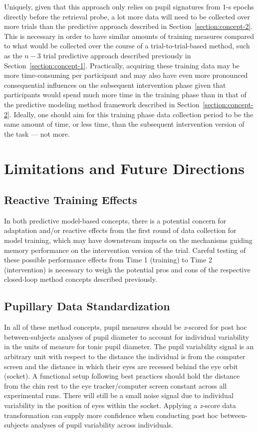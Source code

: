 Uniquely, given that this approach only relies on pupil signatures from 1-s epochs directly before the retrieval probe, a lot more data will need to be collected over more trials than the predictive approach described in Section~\ref{section:concept-2}. This is necessary in order to have similar amounts of training measures compared to what would be collected over the course of a trial-to-trial-based method, such as the $n - 3$ trial predictive approach described previously in Section~\ref{section:concept-1}. Practically, acquiring these training data may be more time-consuming per participant and may also have even more pronounced consequential influences on the subsequent intervention phase given that participants would spend much more time in the training phase than in that of the predictive modeling method framework described in Section~\ref{section:concept-2}. Ideally, one should aim for this training phase data collection period to be the same amount of time, or less time, than the subsequent intervention version of the task --- not more.

\section{Limitations and Future Directions}

\subsection{Reactive Training Effects}

In both predictive model-based concepts, there is a potential concern for adaptation and/or reactive effects from the first round of data collection for model training, which may have downstream impacts on the mechanisms guiding memory performance on the intervention version of the trial. Careful testing of these possible performance effects from Time 1 (training) to Time 2 (intervention) is necessary to weigh the potential pros and cons of the respective closed-loop method concepts described previously.

\subsection{Pupillary Data Standardization}

In all of these method concepts, pupil measures should be \emph{z}-scored for post hoc between-subjects analyses of pupil diameter to account for individual variability in the units of measure for tonic pupil diameter. The pupil variability signal is an arbitrary unit with respect to the distance the individual is from the computer screen and the distance in which their eyes are recessed behind the eye orbit (socket). A functional setup following best practices should hold the distance from the chin rest to the eye tracker/computer screen constant across all experimental runs. There will still be a small noise signal due to individual variability in the position of eyes within the socket. Applying a \emph{z}-score data transformation can supply more confidence when conducting post hoc between-subjects analyses of pupil variability across individuals.

